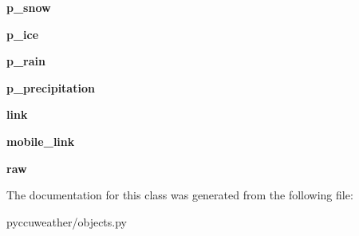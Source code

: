 \begin{DoxyCompactItemize}
\item 
\hypertarget{classpyccuweather_1_1objects_1_1_hourly_forecast_a36be9493393145fa16e192fe94774f5d}{}{\bfseries p\+\_\+snow}\label{classpyccuweather_1_1objects_1_1_hourly_forecast_a36be9493393145fa16e192fe94774f5d}

\item 
\hypertarget{classpyccuweather_1_1objects_1_1_hourly_forecast_a77d246511314edaa8021c8114cd90e10}{}{\bfseries p\+\_\+ice}\label{classpyccuweather_1_1objects_1_1_hourly_forecast_a77d246511314edaa8021c8114cd90e10}

\item 
\hypertarget{classpyccuweather_1_1objects_1_1_hourly_forecast_a2c155addb274309204488e368811cf16}{}{\bfseries p\+\_\+rain}\label{classpyccuweather_1_1objects_1_1_hourly_forecast_a2c155addb274309204488e368811cf16}

\item 
\hypertarget{classpyccuweather_1_1objects_1_1_hourly_forecast_a09c7ffa018743d902c8473e73b88c40a}{}{\bfseries p\+\_\+precipitation}\label{classpyccuweather_1_1objects_1_1_hourly_forecast_a09c7ffa018743d902c8473e73b88c40a}

\item 
\hypertarget{classpyccuweather_1_1objects_1_1_hourly_forecast_acfa95a8f4af257330b5011e954721852}{}{\bfseries link}\label{classpyccuweather_1_1objects_1_1_hourly_forecast_acfa95a8f4af257330b5011e954721852}

\item 
\hypertarget{classpyccuweather_1_1objects_1_1_hourly_forecast_a84f6ad0af8af412bb8f717c853248507}{}{\bfseries mobile\+\_\+link}\label{classpyccuweather_1_1objects_1_1_hourly_forecast_a84f6ad0af8af412bb8f717c853248507}

\item 
\hypertarget{classpyccuweather_1_1objects_1_1_hourly_forecast_a40177f73dc2078e640b90ed96f20226f}{}{\bfseries raw}\label{classpyccuweather_1_1objects_1_1_hourly_forecast_a40177f73dc2078e640b90ed96f20226f}

\end{DoxyCompactItemize}


The documentation for this class was generated from the following file\+:\begin{DoxyCompactItemize}
\item 
pyccuweather/objects.\+py\end{DoxyCompactItemize}
